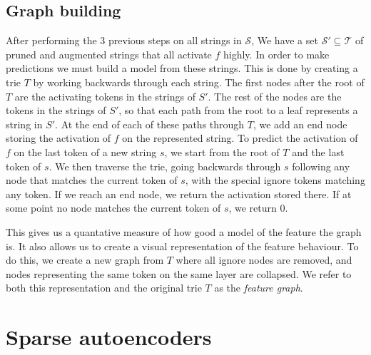 \subsection{Graph building}
After performing the 3 previous steps on all strings in $\mathcal S$, 
We have a set $\mathcal S'\subseteq\mathcal T$ 
of pruned and augmented strings that all activate $f$ highly.
In order to make predictions we must build a model from these strings.
This is done by creating a trie $T$ 
by working backwards through each string.
The first nodes after the root of $T$ are the activating tokens 
in the strings of $S'$.
The rest of the nodes are the tokens in the strings of $S'$, 
so that each path from the root to a leaf represents a string in $S'$.
At the end of each of these paths through $T$, 
we add an end node storing the activation of $f$ on the represented string.
To predict the activation of $f$ on the last token of a new string $s$, 
we start from the root of $T$ and the last token of $s$.
We then traverse the trie, going backwards through $s$ 
following any node that matches the current token of $s$, 
with the special ignore tokens matching any token.
If we reach an end node, we return the activation stored there.
If at some point no node matches the current token of $s$, 
we return $0$.

This gives us a quantative measure of how good a model of the feature 
the graph is.
It also allows us to create a visual representation 
of the feature behaviour.
To do this, we create a new graph from $T$ 
where all ignore nodes are removed, 
and nodes representing the same token on the same layer are collapsed.
We refer to both this representation and the original trie $T$ 
as the \emph{feature graph}.

\section{Sparse autoencoders}
\label{sec:sae}
